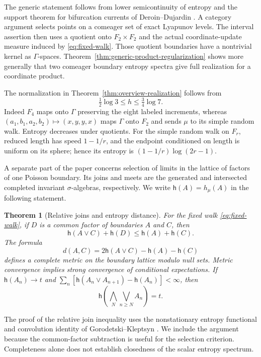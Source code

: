 \documentclass[11pt,letterpaper]{amsart}
\newtheorem{maintheorem}{Theorem}
\theoremstyle{definition}
\theoremstyle{remark}
\numberwithin{equation}{section}
\begin{document}
The generic statement follows from lower semicontinuity of entropy
and the support theorem for bifurcation currents of
Deroin--Dujardin \cite{DD}. A category argument selects points on a
comeager set of exact Lyapunov levels. The interval assertion then uses
a quotient onto $F_2\times F_2$ and the actual coordinate-update measure
induced by \eqref{eq:fixed-walk}. Those quotient boundaries have a
nontrivial kernel as $\Gamma$-spaces. Theorem~\ref{thm:generic-product-regularization}
shows more generally that two comeager boundary entropy spectra give
full realization for a coordinate product.

The normalization in Theorem~\ref{thm:overview-realization} follows from
\begin{equation}\label{eq:h-bounds}
 \tfrac12\log3\le h\le\tfrac34\log7.
\end{equation}
Indeed $F_4$ maps onto $\Gamma$ preserving the eight labeled increments,
whereas $(a_1,b_1,a_2,b_2)\mapsto(x,y,y,x)$ maps $\Gamma$ onto $F_2$
and sends $\mu$ to its simple random walk. Entropy decreases under
quotients. For the simple random walk on $F_r$, reduced length has speed
$1-1/r$, and the endpoint conditioned on length is uniform on its
sphere; hence its entropy is $(1-1/r)\log(2r-1)$.

A separate part of the paper concerns selection of limits in the lattice
of factors of one Poisson boundary. Its joins and meets are the generated
and intersected completed invariant $\sigma$-algebras, respectively.
We write $\mathsf h(A)=h_\mu(A)$ in the following statement.

\begin{maintheorem}[Relative joins and entropy distance]\label{thm:overview-lattice}
For the fixed walk \eqref{eq:fixed-walk}, if $D$ is a common factor of
boundaries $A$ and $C$, then
\[
 \mathsf h(A\vee C)+\mathsf h(D)\le\mathsf h(A)+\mathsf h(C).
\]
The formula
\[
 d(A,C)=2\mathsf h(A\vee C)-\mathsf h(A)-\mathsf h(C)
\]
defines a complete metric on the boundary lattice modulo null sets.
Metric convergence implies strong convergence of conditional expectations.
If $\mathsf h(A_n)\to t$ and
$\sum_n[\mathsf h(A_n\vee A_{n+1})-\mathsf h(A_n)]<\infty$, then
\[
 \mathsf h\!\left(\bigwedge_N\bigvee_{n\ge N}A_n\right)=t.
\]
\end{maintheorem}

The proof of the relative join inequality uses the nonstationary entropy
functional and convolution identity of Gorodetski--Kleptsyn \cite{GK}.
We include the argument because the common-factor subtraction is useful
for the selection criterion. Completeness alone does not establish
closedness of the scalar entropy spectrum.
\end{document}
